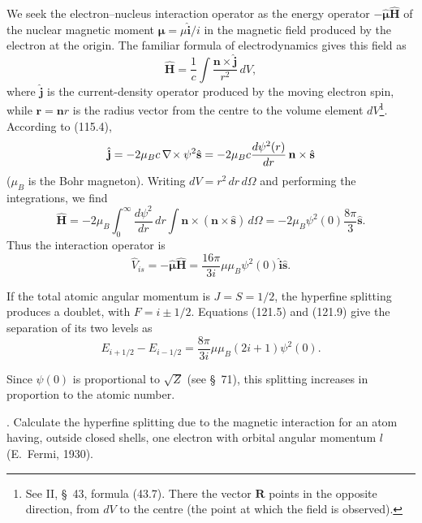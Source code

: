 We seek the electron--nucleus interaction operator as the energy operator
$-\hat{\boldsymbol\mu}\hat{\mathbf H}$ of the nuclear magnetic moment
$\hat{\boldsymbol\mu}=\mu\hat{\mathbf i}/i$ in the magnetic field produced by
the electron at the origin. The familiar formula of electrodynamics gives
this field as
\begin{equation}
 \hat{\mathbf H}=\frac1c\int\frac{\mathbf n\times\hat{\mathbf j}}{r^2}\,dV,
 \tag{121.8}
\end{equation}
where $\hat{\mathbf j}$ is the current-density operator produced by the
moving electron spin, while $\mathbf r=\mathbf n r$ is the radius vector from
the centre to the volume element $dV$\footnote{See II, \S~43, formula (43.7).
There the vector $\mathbf R$ points in the opposite direction, from $dV$ to
the centre (the point at which the field is observed).}. According to (115.4),
\[
 \hat{\mathbf j}=-2\mu_Bc\,\nabla\!\times \psi^2\hat{\mathbf s}
 =-2\mu_Bc\frac{d\psi^2(r)}{dr}\,\mathbf n\times\hat{\mathbf s}
\]
($\mu_B$ is the Bohr magneton). Writing $dV=r^2\,dr\,d\Omega$ and performing
the integrations, we find
\[
 \hat{\mathbf H}=-2\mu_B\int_0^\infty\frac{d\psi^2}{dr}\,dr
 \int\mathbf n\times(\mathbf n\times\hat{\mathbf s})\,d\Omega
 =-2\mu_B\psi^2(0)\frac{8\pi}{3}\hat{\mathbf s}.
\]
Thus the interaction operator is
\begin{equation}
 \hat V_{is}=-\hat{\boldsymbol\mu}\hat{\mathbf H}
 =\frac{16\pi}{3i}\mu\mu_B\psi^2(0)
 \hat{\mathbf i}\hat{\mathbf s}.
 \tag{121.9}
\end{equation}

If the total atomic angular momentum is $J=S=1/2$, the hyperfine splitting
produces a doublet, with $F=i\pm1/2$. Equations (121.5) and (121.9) give the
separation of its two levels as
\begin{equation}
 E_{i+1/2}-E_{i-1/2}
 =\frac{8\pi}{3i}\mu\mu_B(2i+1)\psi^2(0).
 \tag{121.10}
\end{equation}

Since $\psi(0)$ is proportional to $\sqrt Z$ (see \S~71), this splitting
increases in proportion to the atomic number.

. Calculate the hyperfine splitting due to the magnetic interaction
for an atom having, outside closed shells, one electron with orbital angular
momentum $l$ (E.~Fermi, 1930).

